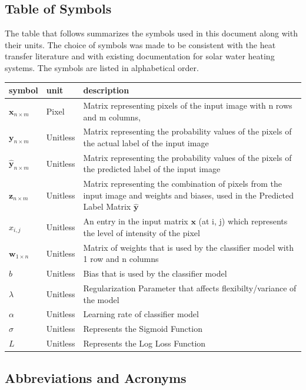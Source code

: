\documentclass[12pt]{article}
\begin{document}
\subsection{Table of Symbols}

The table that follows summarizes the symbols used in this document along with
their units.  The choice of symbols was made to be consistent with the heat
transfer literature and with existing documentation for solar water heating
systems.  The symbols are listed in alphabetical order.

\renewcommand{\arraystretch}{1.2}
\noindent \begin{longtable*}{l l p{12cm}} \toprule
\textbf{symbol} & \textbf{unit} & \textbf{description}\\
\midrule 
$\mathbf{x}_{n \times m}$ & Pixel & Matrix representing pixels of the input image with n rows and m columns, 
\\
$\mathbf{y}_{n \times m}$ & Unitless & Matrix representing the probability values of the pixels of the actual label of the input image
\\
$\mathbf{\hat{y}}_{n \times m}$ & Unitless & Matrix representing the probability values of the pixels of the predicted label of the input image
\\
$\mathbf{z}_{n \times m}$ & Unitless & Matrix representing the combination of pixels from the input image and weights and biases, used in the Predicted Label Matrix $\mathbf{\hat{y}}$
\\
$x_{i,j}$ & Unitless & An entry in the input matrix $\mathbf{x}$ (at i, j) which represents the level of intensity of the pixel
\\
$\mathbf{w}_{1 \times n}$ & Unitless & Matrix of weights that is used by the classifier model with 1 row and n columns
\\
$b$ & Unitless & Bias that is used by the classifier model
\\
$\lambda$ & Unitless & Regularization Parameter that affects flexibilty/variance of the model
\\
$\alpha$ & Unitless & Learning rate of classifier model
\\
$\sigma$ & Unitless & Represents the Sigmoid Function
\\
$L$ & Unitless & Represents the Log Loss Function
\\
\bottomrule
\end{longtable*}

\subsection{Abbreviations and Acronyms}
\end{document}
